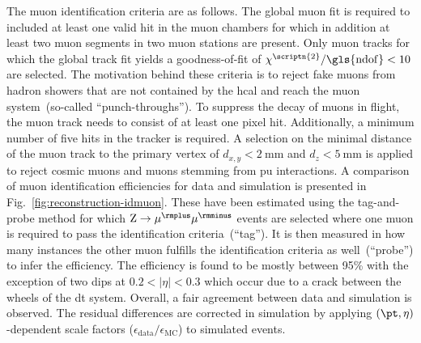 The muon identification criteria are as follows. The global muon fit is required to included at least one valid hit in the muon chambers for which in addition at least two muon segments in two muon stations are present. Only muon tracks for which the global track fit yields a goodness-of-fit of $\chi^\scriptn{2}/\mathrm{\gls{ndof}}<10$ are selected. The motivation behind these criteria is to reject fake muons from hadron showers that are not contained by the \gls{hcal} and reach the muon system~(so-called ``punch-throughs''). To suppress the decay of muons in flight, the muon track needs to consist of at least one pixel hit. Additionally, a minimum number of five hits in the tracker is required. A selection on the minimal distance of the muon track to the primary vertex of $d_{x,y}<2~\mathrm{mm}$ and $d_{z}<5~\mathrm{mm}$ is applied to reject cosmic muons and muons stemming from \gls{pu} interactions. A comparison of muon identification efficiencies for data and simulation is presented in Fig.~\ref{fig:reconstruction-idmuon}. These have been estimated using the tag-and-probe method for which $\mathrm{Z}\to\mu^{\rmplus}\mu^{\rmminus}$ events are selected where one muon is required to pass the identification criteria~(``tag''). It is then measured in how many instances the other muon fulfills the identification criteria as well~(``probe'') to infer the efficiency. The efficiency is found to be mostly between 95\% with the exception of two dips at $0.2<|\eta|<0.3$ which occur due to a crack between the wheels of the \gls{dt} system. Overall, a fair agreement between data and simulation is observed. The residual differences are corrected in simulation by applying $(\pt,\eta)$-dependent scale factors ($\epsilon_\mathrm{data}/\epsilon_\mathrm{MC}$) to simulated events.

